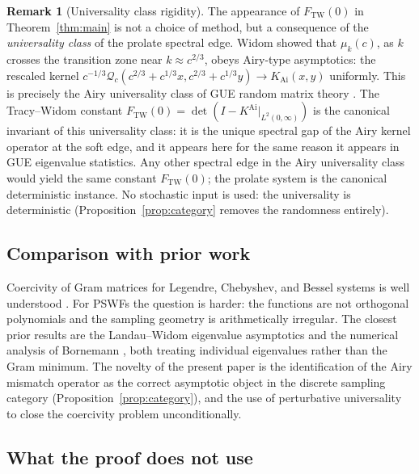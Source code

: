 \documentclass[12pt,a4paper]{amsart}
\theoremstyle{definition}
\newtheorem{remark}[theorem]{Remark}
\newcommand{\KAi}{K^{\mathrm{Ai}}}
\newcommand{\FTW}{F_{\mathrm{TW}}(0)}
\begin{document}

\begin{remark}[Universality class rigidity]\label{rem:universality}
The appearance of $\FTW$ in Theorem~\ref{thm:main} is not a choice
of method, but a consequence of the \emph{universality class} of the
prolate spectral edge.
Widom \cite{Widom1964} showed that $\mu_k(c)$, as $k$ crosses the
transition zone near $k \approx c^{2/3}$, obeys Airy-type asymptotics:
the rescaled kernel $c^{-1/3}\mathcal{Q}_c(c^{2/3} + c^{1/3}x,
c^{2/3} + c^{1/3}y) \to K_{\mathrm{Ai}}(x,y)$
uniformly.
This is precisely the Airy universality class of GUE random matrix
theory \cite{Deift1999}.
The Tracy--Widom constant $\FTW = \det(I - \KAi|_{L^2(0,\infty)})$
is the canonical invariant of this universality class:
it is the unique spectral gap of the Airy kernel operator
at the soft edge, and it appears here for the same reason it appears
in GUE eigenvalue statistics.
Any other spectral edge in the Airy universality class would yield the
same constant $\FTW$; the prolate system is the canonical deterministic
instance.
No stochastic input is used: the universality is deterministic
(Proposition~\ref{prop:category} removes the randomness entirely).
\end{remark}

\subsection{Comparison with prior work}

Coercivity of Gram matrices for Legendre, Chebyshev, and Bessel systems
is well understood \cite{Young2001}.
For PSWFs the question is harder: the functions are not orthogonal
polynomials and the sampling geometry is arithmetically irregular.
The closest prior results are the Landau--Widom eigenvalue asymptotics
\cite{Widom1964,LandauWidom1980} and the numerical analysis of Bornemann
\cite{Bornemann2010}, both treating individual eigenvalues rather than
the Gram minimum.
The novelty of the present paper is the identification of the Airy
mismatch operator as the correct asymptotic object in the discrete
sampling category (Proposition~\ref{prop:category}), and the use of
perturbative universality to close the coercivity problem unconditionally.

\subsection{What the proof does not use}
\end{document}
